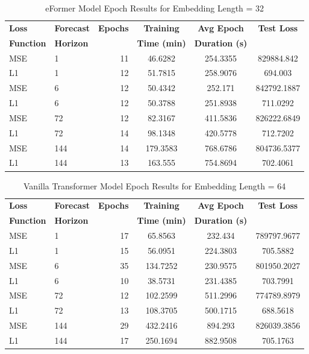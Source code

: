 \documentclass{article}
\begin{document}
\begin{table}
    \footnotesize
    \centering
    \caption{eFormer Model Epoch Results for Embedding Length = 32}
    \begin{tabular}{l|l|r|S|S|S}
        \toprule
        \textbf{Loss} & \textbf{Forecast} & \textbf{Epochs} & \textbf{Training} & \textbf{Avg Epoch} & \textbf{Test Loss} \\
        \textbf{Function} & \textbf{Horizon} & & \textbf{Time (min)} & \textbf{Duration (s)} & \\
        \midrule
        MSE & 1 & 11 & 46.6282 & 254.3355 & 829884.842 \\
        L1 & 1 & 12 & 51.7815 & 258.9076 & 694.003 \\
        \midrule
        MSE & 6 & 12 & 50.4342 & 252.171 & 842792.1887 \\
        L1 & 6 & 12 & 50.3788 & 251.8938 & 711.0292 \\
        \midrule
        MSE & 72 & 12 & 82.3167 & 411.5836 & 826222.6849 \\
        L1 & 72 & 14 & 98.1348 & 420.5778 & 712.7202 \\
        \midrule
        MSE & 144 & 14 & 179.3583 & 768.6786 & 804736.5377 \\
        L1 & 144 & 13 & 163.555 & 754.8694 & 702.4061 \\
    \bottomrule
    \end{tabular}
    \label{tab:eformer_epoch_emb32}
\end{table}

\begin{table}
    \footnotesize
    \centering
    \caption{Vanilla Transformer Model Epoch Results for Embedding Length = 64}
    \begin{tabular}{l|l|r|S|S|S}
        \toprule
        \textbf{Loss} & \textbf{Forecast} & \textbf{Epochs} & \textbf{Training} & \textbf{Avg Epoch} & \textbf{Test Loss} \\
        \textbf{Function} & \textbf{Horizon} & & \textbf{Time (min)} & \textbf{Duration (s)} & \\
        \midrule
            MSE & 1 & 17 & 65.8563 & 232.434 & 789797.9677 \\
        L1 & 1 & 15 & 56.0951 & 224.3803 & 705.5882 \\
        \midrule
        MSE & 6 & 35 & 134.7252 & 230.9575 & 801950.2027 \\
        L1 & 6 & 10 & 38.5731 & 231.4385 & 703.7991 \\
        \midrule
        MSE & 72 & 12 & 102.2599 & 511.2996 & 774789.8979 \\
        L1 & 72 & 13 & 108.3705 & 500.1715 & 688.5618 \\
        \midrule
        MSE & 144 & 29 & 432.2416 & 894.293 & 826039.3856 \\
        L1 & 144 & 17 & 250.1694 & 882.9508 & 705.1763 \\
    \bottomrule
    \end{tabular}
    \label{tab:vanillatransformer_epoch_emb64}
\end{table}
\end{document}
